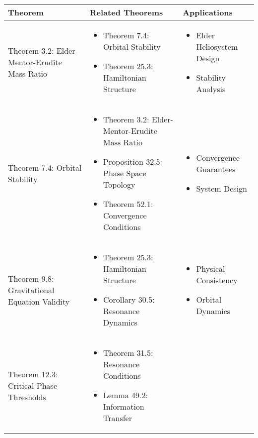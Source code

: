 \begin{table}[h]
\centering
\begin{tabular}{|l|p{7cm}|p{4cm}|}
\hline
\textbf{Theorem} & \textbf{Related Theorems} & \textbf{Applications} \\
\hline
Theorem 3.2: Elder-Mentor-Erudite Mass Ratio & 
\begin{itemize}
    \item Theorem 7.4: Orbital Stability
    \item Theorem 25.3: Hamiltonian Structure
\end{itemize} &
\begin{itemize}
    \item Elder Heliosystem Design
    \item Stability Analysis
\end{itemize} \\
\hline
Theorem 7.4: Orbital Stability &
\begin{itemize}
    \item Theorem 3.2: Elder-Mentor-Erudite Mass Ratio
    \item Proposition 32.5: Phase Space Topology
    \item Theorem 52.1: Convergence Conditions
\end{itemize} &
\begin{itemize}
    \item Convergence Guarantees
    \item System Design
\end{itemize} \\
\hline
Theorem 9.8: Gravitational Equation Validity &
\begin{itemize}
    \item Theorem 25.3: Hamiltonian Structure
    \item Corollary 30.5: Resonance Dynamics
\end{itemize} &
\begin{itemize}
    \item Physical Consistency
    \item Orbital Dynamics
\end{itemize} \\
\hline
Theorem 12.3: Critical Phase Thresholds &
\begin{itemize}
    \item Theorem 31.5: Resonance Conditions
    \item Lemma 49.2: Information Transfer
\end{itemize} &
\begin{itemize}

\end{itemize}
\end{tabular}
\end{table}
